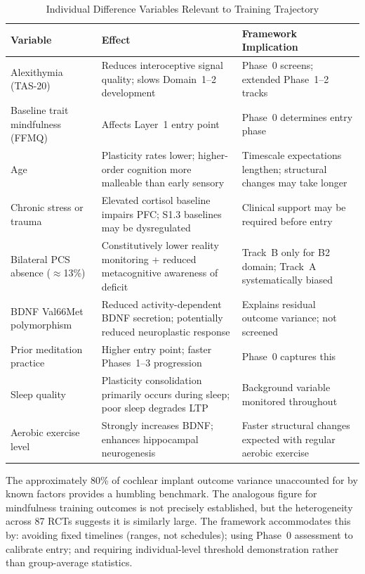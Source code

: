 \documentclass[12pt, a4paper]{article}
\begin{document}
\begin{table}[htbp]
\centering
\caption{Individual Difference Variables Relevant to Training Trajectory}
\label{tab:individual}
\small
\begin{tabular}{p{3cm}p{4.5cm}p{5.5cm}}
\toprule
\textbf{Variable} & \textbf{Effect} & \textbf{Framework Implication} \\
\midrule
Alexithymia (TAS-20) & Reduces interoceptive signal quality; slows Domain~1--2 development & Phase~0 screens; extended Phase~1--2 tracks \\[4pt]
Baseline trait mindfulness (FFMQ) & Affects Layer~1 entry point & Phase~0 determines entry phase \\[4pt]
Age & Plasticity rates lower; higher-order cognition more malleable than early sensory & Timescale expectations lengthen; structural changes may take longer \\[4pt]
Chronic stress or trauma & Elevated cortisol baseline impairs PFC; S1.3 baselines may be dysregulated & Clinical support may be required before entry \\[4pt]
Bilateral PCS absence ($\approx$13\%) & Constitutively lower reality monitoring + reduced metacognitive awareness of deficit \citep{buda2011} & Track~B only for B2 domain; Track~A systematically biased \\[4pt]
BDNF Val66Met polymorphism & Reduced activity-dependent BDNF secretion; potentially reduced neuroplastic response & Explains residual outcome variance; not screened \\[4pt]
Prior meditation practice & Higher entry point; faster Phases~1--3 progression & Phase~0 captures this \\[4pt]
Sleep quality & Plasticity consolidation primarily occurs during sleep; poor sleep degrades LTP & Background variable monitored throughout \\[4pt]
Aerobic exercise level & Strongly increases BDNF; enhances hippocampal neurogenesis & Faster structural changes expected with regular aerobic exercise \\
\bottomrule
\end{tabular}
\end{table}

\noindent
The approximately 80\% of cochlear implant outcome variance unaccounted for by known
factors \citep{fallon2009} provides a humbling benchmark. The analogous figure for
mindfulness training outcomes is not precisely established, but the heterogeneity
across 87 RCTs \citep{gkintoni2025} suggests it is similarly large. The framework
accommodates this by: avoiding fixed timelines (ranges, not schedules); using
Phase~0 assessment to calibrate entry; and requiring individual-level threshold
demonstration rather than group-average statistics.
\end{document}
